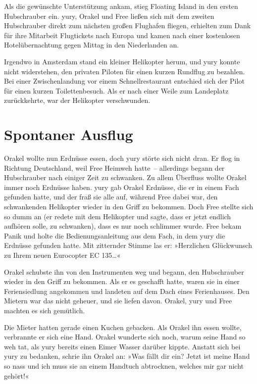Als die gewünschte Unterstützung ankam, stieg Floating Island in den ersten Hubschrauber ein. yury, Orakel und Free ließen sich mit dem zweiten Hubschrauber direkt zum nächsten großen Flughafen fliegen, erhielten zum Dank für ihre Mitarbeit Flugtickets nach Europa und kamen nach einer kostenlosen Hotelübernachtung gegen Mittag in den Niederlanden an.

Irgendwo in Amsterdam stand ein kleiner Helikopter herum, und yury konnte nicht widerstehen, den privaten Piloten für einen kurzen Rundflug zu bezahlen. Bei einer Zwischenlandung vor einem Schnellrestaurant entschied sich der Pilot für einen kurzen Toilettenbesuch. Als er nach einer Weile zum Landeplatz zurückkehrte, war der Helikopter verschwunden.


\chapter{Spontaner Ausflug}

Orakel wollte nun Erdnüsse essen, doch yury störte sich nicht dran. Er flog in Richtung Deutschland, weil Free Heimweh hatte~– allerdings begann der Hubschrauber nach einiger Zeit zu schwanken. Zu allem Überfluss wollte Orakel immer noch Erdnüsse haben. yury gab Orakel Erdnüsse, die er in einem Fach gefunden hatte, und der fraß sie alle auf, während Free dabei war, den schwankenden Helikopter wieder in den Griff zu bekommen. Doch Free stellte sich so dumm an (er redete mit dem Helikopter und sagte, dass er jetzt endlich aufhören solle, zu schwanken), dass es nur noch schlimmer wurde. Free bekam Panik und holte die Bedienungsanleitung aus dem Fach, in dem yury die Erdnüsse gefunden hatte. Mit zitternder Stimme las er: »Herzlichen Glückwunsch zu Ihrem neuen Eurocopter EC 135…«

Orakel schubste ihn von den Instrumenten weg und begann, den Hubschrauber wieder in den Griff zu bekommen. Als er es geschafft hatte, waren sie in einer Feriensiedlung angekommen und landeten auf dem Dach eines Ferienhauses. Den Mietern war das nicht geheuer, und sie liefen davon. Orakel, yury und Free machten es sich gemütlich.

Die Mieter hatten gerade einen Kuchen gebacken. Als Orakel ihn essen wollte, verbrannte er sich eine Hand. Orakel wunderte sich noch, warum seine Hand so weh tat, als yury bereits einen Eimer Wasser darüber kippte. Anstatt sich bei yury zu bedanken, schrie ihn Orakel an: »Was fällt dir ein? Jetzt ist meine Hand so nass und ich muss sie an einem Handtuch abtrocknen, welches mir gar nicht gehört!«

